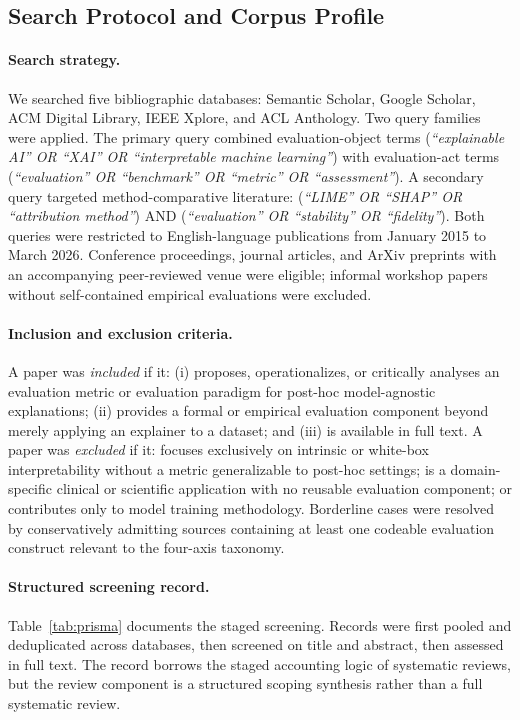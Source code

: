 \documentclass[10pt]{article}
\begin{document}
\subsection{Search Protocol and Corpus Profile}

\paragraph{Search strategy.}
We searched five bibliographic databases: Semantic Scholar, Google
Scholar, ACM Digital Library, IEEE Xplore, and ACL Anthology. Two
query families were applied. The primary query combined evaluation-object
terms (\emph{``explainable AI'' OR ``XAI'' OR ``interpretable machine
learning''}) with evaluation-act terms (\emph{``evaluation'' OR
``benchmark'' OR ``metric'' OR ``assessment''}). A secondary query
targeted method-comparative literature: (\emph{``LIME'' OR ``SHAP'' OR
``attribution method''}) AND (\emph{``evaluation'' OR ``stability'' OR
``fidelity''}). Both queries were restricted to English-language
publications from January 2015 to March 2026. Conference proceedings,
journal articles, and ArXiv preprints with an accompanying peer-reviewed
venue were eligible; informal workshop papers without self-contained
empirical evaluations were excluded.

\paragraph{Inclusion and exclusion criteria.}
A paper was \emph{included} if it: (i) proposes, operationalizes, or
critically analyses an evaluation metric or evaluation paradigm for
post-hoc model-agnostic explanations; (ii) provides a formal or
empirical evaluation component beyond merely applying an explainer to a
dataset; and (iii) is available in full text. A paper was \emph{excluded}
if it: focuses exclusively on intrinsic or white-box interpretability
without a metric generalizable to post-hoc settings; is a
domain-specific clinical or scientific application with no reusable
evaluation component; or contributes only to model training methodology.
Borderline cases were resolved by conservatively admitting sources
containing at least one codeable evaluation construct relevant to the
four-axis taxonomy.

\paragraph{Structured screening record.}
Table~\ref{tab:prisma} documents the staged screening. Records were
first pooled and deduplicated across databases, then screened on title
and abstract, then assessed in full text. The record borrows the staged
accounting logic of systematic reviews, but the review component is a
structured scoping synthesis rather than a full systematic review.
\end{document}
